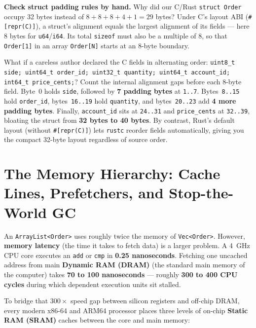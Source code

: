 \begin{labbox}
\textbf{Check struct padding rules by hand.} Why did our C/Rust \texttt{struct Order} occupy 32 bytes instead of $8 + 8 + 8 + 4 + 1 = 29$ bytes? Under C's layout ABI (\texttt{\#[repr(C)]}), a struct's alignment equals the largest alignment of its fields --- here $8$ bytes for \texttt{u64}/\texttt{i64}. Its total \texttt{sizeof} must also be a multiple of $8$, so that \texttt{Order[1]} in an array \texttt{Order[N]} starts at an 8-byte boundary.

What if a careless author declared the C fields in alternating order:
\texttt{uint8\_t side; uint64\_t order\_id; uint32\_t quantity; uint64\_t account\_id; int64\_t price\_cents;}?
Count the internal alignment gaps before each 8-byte field. Byte~0 holds \texttt{side}, followed by \textbf{7 padding bytes} at \texttt{1..7}. Bytes~\texttt{8..15} hold \texttt{order\_id}, bytes~\texttt{16..19} hold \texttt{quantity}, and bytes~\texttt{20..23} add \textbf{4 more padding bytes}. Finally, \texttt{account\_id} sits at \texttt{24..31} and \texttt{price\_cents} at \texttt{32..39}, bloating the struct from \textbf{32 bytes to 40 bytes}. By contrast, Rust's default layout (without \texttt{\#[repr(C)]}) lets \texttt{rustc} reorder fields automatically, giving you the compact 32-byte layout regardless of source order.
\end{labbox}

\section{The Memory Hierarchy: Cache Lines, Prefetchers, and Stop-the-World GC}
\label{ch01:cache-and-gc}

An \texttt{ArrayList<Order>} uses roughly twice the memory of \texttt{Vec<Order>}. However, \textbf{memory latency} (the time it takes to fetch data) is a larger problem. A 4~GHz CPU core executes an \texttt{add} or \texttt{cmp} in \textbf{0.25 nanoseconds}. Fetching one uncached address from main \textbf{Dynamic RAM (DRAM)} (the standard main memory of the computer) takes \textbf{70 to 100 nanoseconds} --- roughly \textbf{300 to 400 CPU cycles} during which dependent execution units sit stalled.

To bridge that $300\times$ speed gap between silicon registers and off-chip DRAM, every modern x86-64 and ARM64 processor places three levels of on-chip \textbf{Static RAM (SRAM)} caches between the core and main memory:

